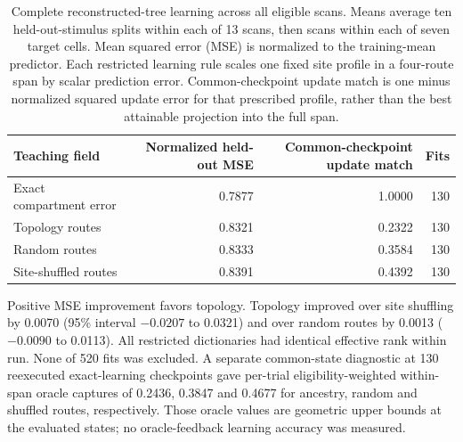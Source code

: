\begin{table}[ht]
\centering
\caption{Complete reconstructed-tree learning across all eligible scans. Means average ten held-out-stimulus splits within each of 13 scans, then scans within each of seven target cells. Mean squared error (MSE) is normalized to the training-mean predictor. Each restricted learning rule scales one fixed site profile in a four-route span by scalar prediction error. Common-checkpoint update match is one minus normalized squared update error for that prescribed profile, rather than the best attainable projection into the full span.}
\label{tab:functional_full_tree}
\small
\begin{tabular}{lrrr}
\toprule
Teaching field & Normalized held-out MSE & Common-checkpoint update match & Fits \\
\midrule
Exact compartment error & 0.7877 & 1.0000 & 130 \\
Topology routes & 0.8321 & 0.2322 & 130 \\
Random routes & 0.8333 & 0.3584 & 130 \\
Site-shuffled routes & 0.8391 & 0.4392 & 130 \\
\bottomrule
\end{tabular}

\vspace{4pt}
\small Positive MSE improvement favors topology. Topology improved over
site shuffling by 0.0070 (95\% interval $-0.0207$ to 0.0321) and over random
routes by 0.0013 ($-0.0090$ to 0.0113). All restricted dictionaries had
identical effective rank within run. None of 520 fits was excluded. A
separate common-state diagnostic at 130 reexecuted exact-learning checkpoints
gave per-trial eligibility-weighted within-span oracle captures of 0.2436,
0.3847 and 0.4677 for ancestry, random and shuffled routes, respectively.
Those oracle values are geometric upper bounds at the evaluated states;
no oracle-feedback learning accuracy was measured.
\end{table}

